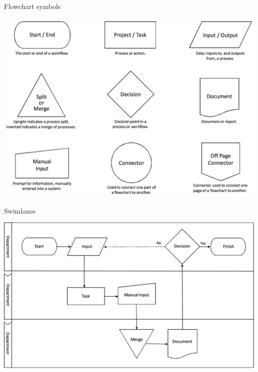\begin{frame}{Flowchart symbols}
	\begin{center}
		\includegraphics[height=0.8\textheight]{flowchart_symbols}
	\end{center}
\end{frame}

\begin{frame}{Swimlanes}
	\begin{center}
		\includegraphics[width=\textwidth]{swimlanes}
	\end{center}
\end{frame}

